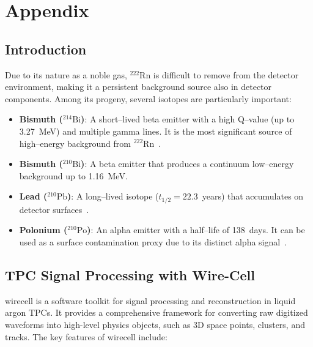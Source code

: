 \section{Appendix}\label{sec:APPENDIX}
\subsection*{Introduction}
Due to its nature as a noble gas, \(^{222}\text{Rn}\) is difficult to remove from the detector environment, making it a persistent background source also in detector components. Among its progeny, several isotopes are particularly important:

\begin{itemize}
  \item \textbf{Bismuth (\(^{214}\text{Bi}\))}: A short--lived beta emitter with a high Q--value (up to \SI{3.27}{\mega\electronvolt}) and multiple gamma lines. It is the most significant source of high--energy background from \(^{222}\text{Rn}\)~\cite{pdg2024}.
  \item \textbf{Bismuth (\(^{210}\text{Bi}\))}: A beta emitter that produces a continuum low--energy background up to \SI{1.16}{\mega\electronvolt}.
  \item \textbf{Lead (\(^{210}\text{Pb}\))}: A long--lived isotope (\(t_{1/2} = 22.3\)~years) that accumulates on detector surfaces~\cite{exo_radon}.
  \item \textbf{Polonium (\(^{210}\text{Po}\))}: An alpha emitter with a half--life of 138~days. It can be used as a surface contamination proxy due to its distinct alpha signal~\cite{saldanha_thesis}.
\end{itemize}

\subsection*{TPC Signal Processing with Wire-Cell}
\gls{wirecell} is a software toolkit for signal processing and reconstruction in liquid argon TPCs. It provides a comprehensive framework for converting raw digitized waveforms into high-level physics objects, such as 3D space points, clusters, and tracks. The key features of \gls{wirecell} include:

